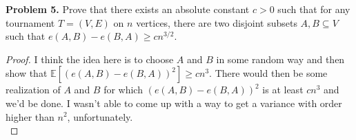 \documentclass[11pt,letterpaper]{report}
\newcommand{\E}{\mathbb{E}}
\begin{document}
\noindent\textbf{Problem 5. }
Prove that there exists an absolute constant $c>0$ such that for any tournament $T = (V, E)$ on $n$ vertices, there are two disjoint subsets $A,B\subseteq V$ such that $e(A,B)-e(B,A) \geq cn^{3/2}$.

\begin{proof}
    I think the idea here is to choose $A$ and $B$ in some random way and then show that $\E[(e(A,B)-e(B,A))^2] \geq cn^3$.
    There would then be some realization of $A$ and $B$ for which $(e(A,B)-e(B,A))^2$ is at least $cn^3$ and we'd be done.
    I wasn't able to come up with a way to get a variance with order higher than $n^2$, unfortunately.\\


\end{proof}
\end{document}
